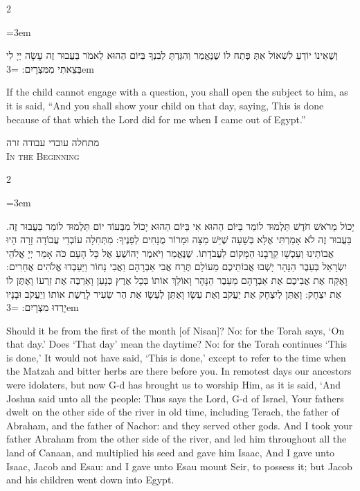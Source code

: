 \documentclass[11pt, openany]{book}
\newcommand{\sederdivider}{%
  \par\vspace{6pt}
  \begin{center}
    \textcolor{sedergold}{\pgfornament[width=1.5cm]{11}}
  \end{center}
  \par\vspace{6pt}
}
\newenvironment{bilingual}{%
  \par\vspace{4pt}%
  \begin{paracol}{2}%
}{%
  \end{paracol}%
  \par\vspace{2pt}%
}
\newenvironment{hebrewcol}{%
  \switchcolumn[1]%
  \begingroup
  \RTL
  \hebrewfont\large
  \setstretch{1.4}%
  \emergencystretch=3em
  \tolerance=9999
  \parindent=0pt\relax
}{%
  \endRTL
  \endgroup
}
\newenvironment{englishcol}{%
  \switchcolumn[0]%
  \begingroup
  \setstretch{1.4}%
  \emergencystretch=3em
  \tolerance=9999
  \normalsize
  \rightskip=0.12in\relax
}{%
  \endgroup
}
\newcommand{\subsedertitle}[2]{%
  \par\vspace{8pt}
  \begin{center}
    {\hebrewfontlarge\textcolor{sederblue}{\beginR #1\endR}}\\[3pt]
    {\normalsize\scshape\textcolor{sederblue}{#2}}
  \end{center}
  \par\vspace{3pt}
}
\begin{document}
\begin{bilingual}
\begin{hebrewcol}
וְשֶׁאֵינוֹ יוֹדֵעַ לִשְׁאוֹל אַתְּ פְּתַח לוֹ שֶׁנֶּאֱמַר וְהִגַּדְתָּ לְבִנְךָ בַּיּוֹם הַהוּא לֵאמֹר בַּעֲבוּר זֶה עָשָׂה יְיָ לִי בְּצֵאתִי מִמִּצְרָיִם:
\end{hebrewcol}
\begin{englishcol}
If the child cannot engage with a question, you shall open the subject to him, as it is said, ``And you shall show your child on that day, saying, This is done because of that which the Lord did for me when I came out of Egypt.''
\end{englishcol}
\end{bilingual}

\sederdivider

\subsedertitle{מתחלה עובדי עבודה זרה}{In the Beginning}

\begin{bilingual}
\begin{hebrewcol}
יָכוֹל מֵרֹאשׁ חֹדֶשׁ תַּלְמוּד לוֹמַר בַּיּוֹם הַהוּא אִי בַּיּוֹם הַהוּא יָכוֹל מִבְּעוֹד יוֹם תַּלְמוּד לוֹמַר בַּעֲבוּר זֶה. בַּעֲבוּר זֶה לֹא אָמַרְתִּי אֶלָּא בְּשָׁעָה שֶׁיֵּשׁ מַצָּה וּמָרוֹר מֻנָּחִים לְפָנֶיךָ:
מִתְּחִלָה עוֹבְדֵי עֲבוֹדָה זָרָה הָיוּ אֲבוֹתֵינוּ וְעַכְשָׁו קֵרְבָנוּ הַמָּקוֹם לַעֲבֹדָתוֹ. שֶׁנֶּאֱמַר וַיֹּאמֶר יְהוֹשֻׁעַ אֶל כָּל הָעָם כֹּה אָמַר יְיָ אֱלֹהֵי יִשְׂרָאֵל בְּעֵבֶר הַנָּהָר יָשְׁבוּ אֲבוֹתֵיכֶם מֵעוֹלָם תֶּרַח אֲבִי אַבְרָהָם וַאֲבִי נָחוֹר וַיַּעַבְדוּ אֱלֹהִים אֲחֵרִים:
וָאֶקַּח אֶת אֲבִיכֶם אֶת אַבְרָהָם מֵעֵבֶר הַנָּהָר וָאוֹלֵךְ אוֹתוֹ בְּכָל אֶרֶץ כְּנָעַן וָאַרְבֶּה אֶת זַרְעוֹ וָאֶתֶּן לוֹ אֶת יִצְחָק: וָאֶתֵּן לְיִצְחָק אֶת יַעֲקֹב וְאֶת עֵשָׂו וָאֶתֵּן לְעֵשָׂו אֶת הַר שֵׂעִיר לָרֶשֶׁת אוֹתוֹ וְיַעֲקֹב וּבָנָיו יָרְדוּ מִצְרָיִם:
\end{hebrewcol}
\begin{englishcol}
Should it be from the first of the month [of Nisan]? No: for the Torah says, `On that day.' Does `That day' mean the daytime? No: for the Torah continues `This is done,' It would not have said, `This is done,' except to refer to the time when the Matzah and bitter herbs are there before you.
In remotest days our ancestors were idolaters, but now G-d has brought us to worship Him, as it is said, `And Joshua said unto all the people: Thus says the Lord, G-d of Israel, Your fathers dwelt on the other side of the river in old time, including Terach, the father of Abraham, and the father of Nachor: and they served other gods.
And I took your father Abraham from the other side of the river, and led him throughout all the land of Canaan, and multiplied his seed and gave him Isaac, And I gave unto Isaac, Jacob and Esau: and I gave unto Esau mount Seir, to possess it; but Jacob and his children went down into Egypt.
\end{englishcol}
\end{bilingual}
\sederdivider
\end{document}
